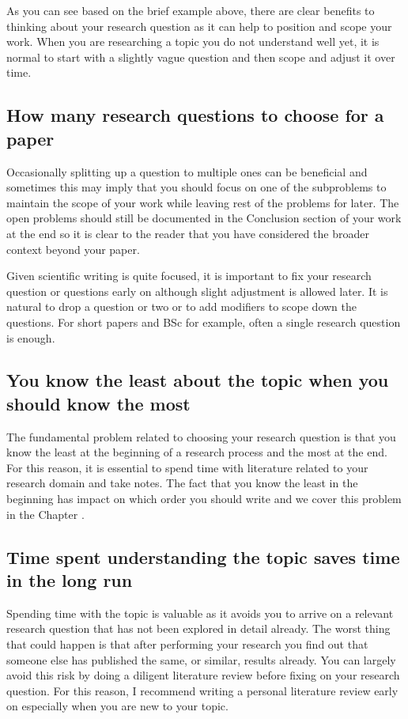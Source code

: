 As you can see based on the brief example above, there are clear benefits to thinking about your research question as it can help to position and scope your work.
When you are researching a topic you do not understand well yet, it is normal to start with a slightly vague question and then scope and adjust it over time.

\subsection{How many research questions to choose for a paper}

Occasionally splitting up a question to multiple ones can be beneficial and sometimes this may imply that you should focus on one of the subproblems to maintain the scope of your work while leaving rest of the problems for later.
The open problems should still be documented in the Conclusion section of your work at the end so it is clear to the reader that you have considered the broader context beyond your paper.

Given scientific writing is quite focused, it is important to fix your research question or questions early on although slight adjustment is allowed later.
It is natural to drop a question or two or to add modifiers to scope down the questions.
For short papers and BSc for example, often a single research question is enough.

\subsection{You know the least about the topic when you should know the most}

The fundamental problem related to choosing your research question is that you know the least at the beginning of a research process and the most at the end.
For this reason, it is essential to spend time with literature related to your research domain and take notes.
The fact that you know the least in the beginning has impact on which order you should write and we cover this problem in the Chapter .

\subsection{Time spent understanding the topic saves time in the long run}

Spending time with the topic is valuable as it avoids you to arrive on a relevant research question that has not been explored in detail already.
The worst thing that could happen is that after performing your research you find out that someone else has published the same, or similar, results already.
You can largely avoid this risk by doing a diligent literature review before fixing on your research question.
For this reason, I recommend writing a personal literature review early on especially when you are new to your topic.

